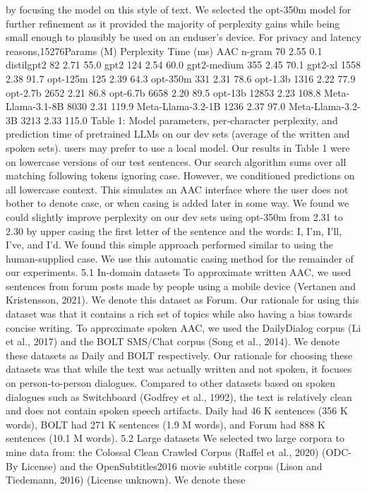 by focusing the model on this style of text. We
selected the opt-350m model for further refinement
as it provided the majority of perplexity gains while
being small enough to plausibly be used on an enduser’s device. For privacy and latency reasons,15276Params (M) Perplexity Time (ms)
AAC n-gram 70 2.55 0.1
distilgpt2 82 2.71 55.0
gpt2 124 2.54 60.0
gpt2-medium 355 2.45 70.1
gpt2-xl 1558 2.38 91.7
opt-125m 125 2.39 64.3
opt-350m 331 2.31 78.6
opt-1.3b 1316 2.22 77.9
opt-2.7b 2652 2.21 86.8
opt-6.7b 6658 2.20 89.5
opt-13b 12853 2.23 108.8
Meta-Llama-3.1-8B 8030 2.31 119.9
Meta-Llama-3.2-1B 1236 2.37 97.0
Meta-Llama-3.2-3B 3213 2.33 115.0
Table 1: Model parameters, per-character perplexity,
and prediction time of pretrained LLMs on our dev sets
(average of the written and spoken sets).
users may prefer to use a local model.
Our results in Table 1 were on lowercase versions of our test sentences. Our search algorithm
sums over all matching following tokens ignoring
case. However, we conditioned predictions on all
lowercase context. This simulates an AAC interface where the user does not bother to denote case,
or when casing is added later in some way. We
found we could slightly improve perplexity on our
dev sets using opt-350m from 2.31 to 2.30 by upper casing the first letter of the sentence and the
words: I, I’m, I’ll, I’ve, and I’d. We found this
simple approach performed similar to using the
human-supplied case. We use this automatic casing method for the remainder of our experiments.
5.1 In-domain datasets
To approximate written AAC, we used sentences
from forum posts made by people using a mobile
device (Vertanen and Kristensson, 2021). We denote this dataset as Forum. Our rationale for using
this dataset was that it contains a rich set of topics
while also having a bias towards concise writing.
To approximate spoken AAC, we used the DailyDialog corpus (Li et al., 2017) and the BOLT
SMS/Chat corpus (Song et al., 2014). We denote
these datasets as Daily and BOLT respectively. Our
rationale for choosing these datasets was that while
the text was actually written and not spoken, it focuses on person-to-person dialogues. Compared
to other datasets based on spoken dialogues such
as Switchboard (Godfrey et al., 1992), the text is
relatively clean and does not contain spoken speech
artifacts. Daily had 46 K sentences (356 K words),
BOLT had 271 K sentences (1.9 M words), and Forum had 888 K sentences (10.1 M words).
5.2 Large datasets
We selected two large corpora to mine data from:
the Colossal Clean Crawled Corpus (Raffel et al.,
2020) (ODC-By License) and the OpenSubtitles2016 movie subtitle corpus (Lison and Tiedemann, 2016) (License unknown). We denote these
